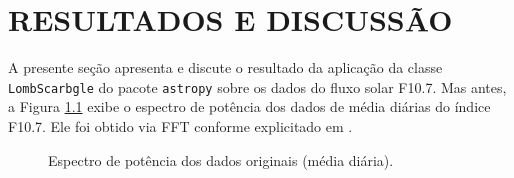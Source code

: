\chapter{RESULTADOS E DISCUSSÃO}

A presente seção apresenta e discute o resultado da aplicação da classe \texttt{LombScarbgle} do pacote \texttt{astropy} sobre os dados do fluxo solar F10.7. Mas antes, a Figura \ref{fig:original365} exibe o espectro de potência dos dados de média diárias do índice F10.7. Ele foi obtido via FFT conforme explicitado em . %

\vspace{-8mm}
\begin{figure}[ht!]
	\caption{Espectro de potência dos dados originais (média diária).}
	\vspace{1mm}	%
	\begin{center}
	\end{center}
	\vspace{-1mm}	%
	\label{fig:original365}
\end{figure}

